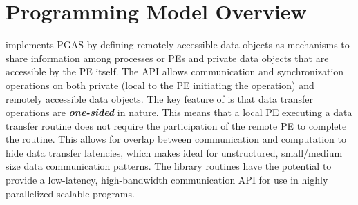 \section{Programming Model Overview}
\openshmem implements \ac{PGAS} by defining remotely accessible data objects as mechanisms to share information among \openshmem processes or \acp{PE} and private data objects that are accessible by the \ac{PE} itself. The \ac{API} allows communication and synchronization operations on both private (local to the PE initiating the operation) and remotely accessible data objects. The key feature of \openshmem is that data transfer operations are \textit{\textbf{one-sided}} in nature. This means that a local \ac{PE} executing a data transfer routine does not require the participation of the remote \ac{PE} to complete the routine. This allows for overlap between communication and computation to hide data transfer latencies, which makes  \openshmem ideal for unstructured, small/medium size data communication patterns. The \openshmem library routines have the potential to provide a low-latency, high-bandwidth communication \ac{API} for use in highly parallelized scalable programs.  


